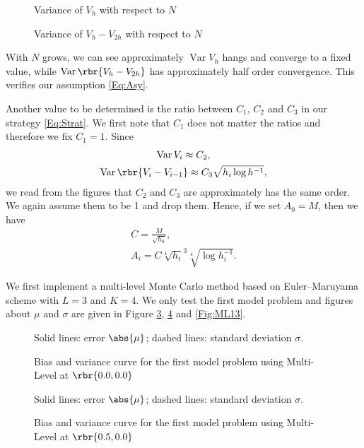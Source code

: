\documentclass[english, nochinese]{pnote}
\DeclareMathOperator\opvar{\mathrm{Var}}
\begin{document}
\begin{figure}[htbp]
\centering

\caption{Variance of $V_h$ with respect to $N$}
\label{Fig:VAll}
\end{figure}

\begin{figure}[htbp]
\centering

\caption{Variance of $ V_h - V_{ 2 h } $ with respect to $N$}
\label{Fig:VDiff}
\end{figure}

With $N$ grows, we can see approximately $ \opvar V_h $ hangs and converge to a fixed value, while $ \opvar \rbr{ V_h - V_{ 2 h } } $ has approximately half order convergence. This verifies our assumption \eqref{Eq:Asy}.

Another value to be determined is the ratio between $C_1$, $C_2$ and $C_3$ in our strategy \eqref{Eq:Strat}. We first note that $C_1$ does not matter the ratios and therefore we fix $ C_1 = 1 $. Since
\begin{gather}
\opvar V_i \approx C_2, \\
\opvar \rbr{ V_i - V_{ i - 1 } } \approx  C_3 \sqrt{ h_i \log h^{-1} },
\end{gather}
we read from the figures that $C_2$ and $C_3$ are approximately has the same order. We again assume them to be 1 and drop them. Hence, if we set $ A_0 = M $, then we have
\begin{gather}
C = \frac{M}{\sqrt{h_0}}, \\
A_i = C \sqrt[4]{h_i}^3 \sqrt[4]{ \log h_i^{-1} }.
\end{gather}

We first implement a multi-level Monte Carlo method based on Euler--Maruyama scheme with $ L = 3 $ and $ K = 4 $. We only test the first model problem and figures about $\mu$ and $\sigma$ are given in Figure \ref{Fig:ML11}, \ref{Fig:ML12} and \ref{Fig:ML13}.

\begin{figure}[htbp]
{
\centering

\caption{Bias and variance curve for the first model problem using Multi-Level at $ \rbr{ 0.0, 0.0 } $}
\label{Fig:ML11}
}
{
\footnotesize Solid lines: error $\abs{\mu}$; dashed lines: standard deviation $\sigma$.
}
\end{figure}

\begin{figure}[htbp]
{
\centering

\caption{Bias and variance curve for the first model problem using Multi-Level at $ \rbr{ 0.5, 0.0 } $}
\label{Fig:ML12}
}
{
\footnotesize Solid lines: error $\abs{\mu}$; dashed lines: standard deviation $\sigma$.
}
\end{figure}
\end{document}
